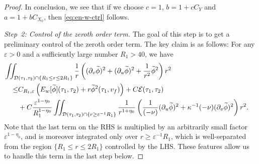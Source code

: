 \documentclass[10pt, reqno]{amsart}
\theoremstyle{definition}
\theoremstyle{remark}
\theoremstyle{conjecture}
\numberwithin{equation}{section}
\newcommand{\set}[1]{\{#1\}}
\newcommand{\rd}{\partial}
\newcommand{\0}{\emptyset}
\newcommand{\veps}{\varepsilon}
\newcommand{\kpp}{\kappa}
\newcommand{\calD}{\mathcal D}
\newcommand{\calE}{\mathcal E}
\newcommand{\dur}{\nu}
\newcommand{\pfstep}[1]{\vspace{.5em} {\it \noindent #1.}}
\newcommand{\phibg}{\overline{\phi}}				%
\newcommand{\phidf}{\widetilde{\phi}}				%
\begin{document}
\begin{proof}
In conclusion, we see that if we choose $c =1$, $b = 1+ c C_{Y}$ and $a = 1 + b C_{X_{0}}$, then \eqref{eq:en-w-ctrl} follows.

\pfstep{Step~2: Control of the zeroth order term}
The goal of this step is to get a preliminary control of the zeroth order term.
The key claim is as follows: For any $\veps > 0$ and a sufficiently large number $R_{1} > 40$, we have
\begin{equation} \label{eq:en-z-ctrl}
\begin{aligned}
& \hskip-2em
	\iint_{\calD(\tau_{1}, \tau_{2}) \cap \set{R_{1} \leq r \leq 2 R_{1}}} \frac{1}{r} \left( (\rd_{v} \phidf)^{2} + (\rd_{u} \phidf)^{2} + \frac{1}{r^{2}} \phidf^{2}\right) r^{2} \\
	\leq & C_{R_{1}, \veps} \left( E_{w}[\phidf](\tau_{1}, \tau_{2}) + r \phidf^{2}(\tau_{1}, v_{f}) \right) + C \calE (\tau_{1}, \tau_{2}) \\
	&  + C \frac{\veps^{1-\eta_{0}}}{R_{1}^{1-\eta_{0}}} \iint_{\calD(\tau_{1}, \tau_{2}) \cap \set{r \geq \veps^{-1} R_{1}}} \frac{1}{r^{1+\eta_{0}}} 
	\left(  \frac{1}{(-\dur)} (\rd_{u} \phidf)^{2} + \kpp^{-1} (-\dur) (\rd_{v} \phidf)^{2} \right) r^{2}.
\end{aligned}
\end{equation}
Note that the last term on the RHS is multiplied by an arbitrarily small factor $\veps^{1-\eta_{0}}$, and is moreover integrated only over $r \geq \veps^{-1} R_{1}$, which is well-separated from the region $\set{R_{1} \leq r \leq 2R_{1}}$ controlled by the LHS. These features allow us to handle this term in the last step below.


\end{proof}
\end{document}
